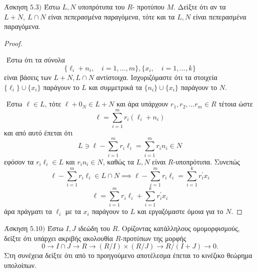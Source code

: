 \documentclass[oneside,a4paper]{article}
\begin{document}
\noindent Άσκηση $5.3)$
\quad Έστω $L,N$ υποπρότυπα του $R$- προτύπου $M.$ Δείξτε ότι αν τα $L+N,\ L\cap N$ είναι πεπερασμένα παραγόμενα, τότε και τα $L, N$ είναι πεπερασμένα παραγόμενα.
\begin{proof} $ $
	
	$ $\newline
	Έστω ότι τα σύνολα $$\{ \ell_i + n_i, \quad i = 1,\ldots,m\}, \{x_i, \quad  i = 1,\ldots, k\}$$ είναι βάσεις των $L+N, L\cap N$ αντίστοιχα. Ισχυριζόμαστε ότι τα στοιχεία $\{\ell_i\}\cup\{x_i\}$ παράγουν το $L$ και συμμετρικά τα $\{n_i\}\cup \{x_i\}$ παράγουν το $N$.

	$ $\newline
	Έστω $\ell \in L$, τότε $\ell + 0_N \in L+N$ και άρα υπάρχουν $r_1,r_2,\ldots r_m \in R$ τέτοια ώστε
	$$\ell = \sum\limits_{i=1}^m r_i (\ell_i + n_i)$$ και από αυτό έπεται ότι 
	$$L \ni \ell - \sum\limits_{i=1}^m r_i \ell_i = \sum\limits_{i=1}^m r_i n_i \in N$$
	εφόσον τα $r_i \ell_i \in L$ και $r_i n_i \in N$, καθώς τα $L,N$ είναι $R$-υποπρότυπα. Συνεπώς $$\ell - \sum\limits_{i=1}^m r_i \ell_i \in L\cap N \implies \ell - \sum\limits_{i=1}^m r_i \ell_i = \sum\limits_{i=1}^k r^{\prime}_i x_i$$
	$$\ell = \sum\limits_{i=1}^m r_i \ell_i + \sum\limits_{i=1}^k r^{\prime}_i x_i$$
	άρα πράγματι τα $\ell_i$ με τα $x_i$ παράγουν το $L$ και εργαζόμαστε όμοια για το $N$.
\end{proof}

\pagebreak



\noindent Άσκηση $5.10)$
\quad Έστω $I, J$ ιδεώδη του $R$. Ορίζοντας κατάλληλους ομομορφισμούς, δείξτε ότι υπάρχει ακριβής ακολουθία $R$-προτύπων  της μορφής $$ 0 \to I \cap J \to R \to (R/I) \times (R/J) \to R/(I+J) \to 0.$$ Στη συνέχεια δείξτε ότι από το προηγούμενο αποτέλεσμα έπεται το κινέζικο θεώρημα υπολοίπων.
\end{document}
